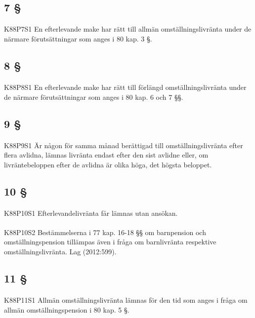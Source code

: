\documentclass[a4paper,notitlepage,openany,10pt]{book}
\begin{document}
\subsection*{7 §}
\paragraph*{}
{\tiny K88P7S1}
En efterlevande make har rätt till allmän omställningslivränta under de närmare förutsättningar som anges i 80 kap. 3 §.
\subsection*{8 §}
\paragraph*{}
{\tiny K88P8S1}
En efterlevande make har rätt till förlängd omställningslivränta under de närmare förutsättningar som anges i 80 kap. 6 och 7 §§.
\subsection*{9 §}
\paragraph*{}
{\tiny K88P9S1}
Är någon för samma månad berättigad till omställningslivränta efter flera avlidna, lämnas livränta endast efter den sist avlidne eller, om livräntebeloppen efter de avlidna är olika höga, det högsta beloppet.
\subsection*{10 §}
\paragraph*{}
{\tiny K88P10S1}
Efterlevandelivränta får lämnas utan ansökan.
\paragraph*{}
{\tiny K88P10S2}
Bestämmelserna i 77 kap. 16-18 §§ om barnpension och omställningspension tillämpas även i fråga om barnlivränta respektive omställningslivränta.
Lag (2012:599).
\subsection*{11 §}
\paragraph*{}
{\tiny K88P11S1}
Allmän omställningslivränta lämnas för den tid som anges i fråga om allmän omställningspension i 80 kap. 5 §.
\end{document}
